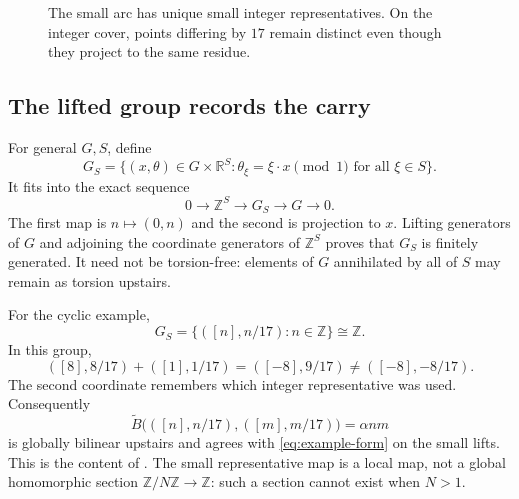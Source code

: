 \documentclass[11pt,a4paper]{article}
\newcommand{\Z}{\mathbb Z}
\newcommand{\R}{\mathbb R}
\newcommand{\JT}[1]{\cite[#1]{JT}}
\theoremstyle{definition}
\numberwithin{equation}{section}
\begin{document}
\begin{figure}[htbp]
\centering
{}
\caption{The small arc has unique small integer representatives. On the
integer cover, points differing by $17$ remain distinct even though
they project to the same residue.}
\label{fig:cover}
\end{figure}

\subsection{The lifted group records the carry}
For general $G,S$, define
\begin{equation}\label{eq:lifted-group}
G_S=\{(x,\theta)\in G\times\R^S:
\theta_\xi=\xi\cdot x\pmod1\text{ for all }\xi\in S\}.
\end{equation}
It fits into the exact sequence
\[0\longrightarrow\Z^S\longrightarrow G_S\longrightarrow G\longrightarrow0.\]
The first map is $n\mapsto(0,n)$ and the second is projection to $x$.
Lifting generators of $G$ and adjoining the coordinate generators of
$\Z^S$ proves that $G_S$ is finitely generated. It need not be
torsion-free: elements of $G$ annihilated by all of $S$ may remain
as torsion upstairs.

For the cyclic example,
\[G_S=\{([n],n/17):n\in\Z\}\cong\Z.\]
In this group,
\[([8],8/17)+([1],1/17)=([-8],9/17)\ne([-8],-8/17).\]
The second coordinate remembers which integer representative was used.
Consequently
\[
\widetilde B\bigl(([n],n/17),([m],m/17)\bigr)=\alpha nm
\]
is globally bilinear upstairs and agrees with \eqref{eq:example-form}
on the small lifts. This is the content of \JT{Example 2.3}.
The small representative map is a local map, not a global homomorphic
section $\Z/N\Z\to\Z$: such a section cannot exist when $N>1$.
\end{document}
